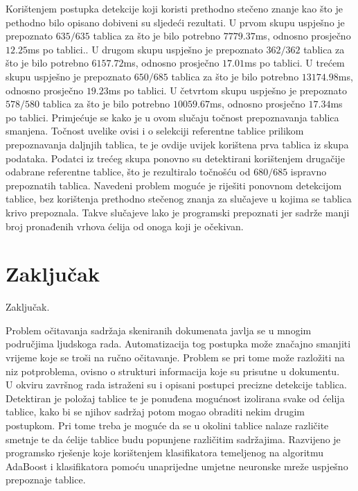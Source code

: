 \documentclass[times, utf8, zavrsni, numeric]{fer}
\begin{document}
Korištenjem postupka detekcije koji koristi prethodno stečeno znanje kao što je pethodno bilo opisano dobiveni su sljedeći rezultati.
U prvom skupu uspješno je prepoznato $635/635$ tablica za što je bilo potrebno $7779.37$ms, odnosno prosječno $12.25$ms po tablici..
U drugom skupu uspješno je prepoznato $362/362$ tablica za što je bilo potrebno $6157.72$ms, odnosno prosječno $17.01$ms po tablici.
U trećem skupu uspješno je prepoznato $650/685$ tablica za što je bilo potrebno $13174.98$ms, odnosno prosječno $19.23$ms po tablici.
U četvrtom skupu uspješno je prepoznato $578/580$ tablica za što je bilo potrebno $10059.67$ms, odnosno prosječno $17.34$ms po tablici.
Primjećuje se kako je u ovom slučaju točnost prepoznavanja tablica smanjena.
Točnost uvelike ovisi i o selekciji referentne tablice prilikom prepoznavanja daljnjih tablica, te je ovdije uvijek korištena prva tablica iz skupa podataka.
Podatci iz trećeg skupa ponovno su detektirani korištenjem drugačije odabrane referentne tablice, što je rezultiralo točnošću od $680/685$ ispravno prepoznatih tablica.
Navedeni problem moguće je riješiti ponovnom detekcijom tablice, bez korištenja prethodno stečenog znanja za slučajeve u kojima se tablica krivo prepoznala.
Takve slučajeve lako je programski prepoznati jer sadrže manji broj pronađenih vrhova ćelija od onoga koji je očekivan.\\


\chapter{Zaključak}
Zaključak.





\begin{sazetak}
Problem očitavanja sadržaja skeniranih dokumenata javlja se u mnogim područjima ljudskoga rada.
Automatizacija tog postupka može značajno smanjiti vrijeme koje se troši na ručno očitavanje. 
Problem se pri tome može razložiti na niz potproblema, ovisno o strukturi informacija koje su prisutne u dokumentu.\\

U okviru završnog rada istraženi su i opisani postupci precizne detekcije tablica. 
Detektiran je položaj tablice te je ponuđena mogućnost izolirana svake od ćelija tablice, kako bi se njihov sadržaj potom mogao obraditi nekim drugim postupkom.
Pri tome treba je moguće da se u okolini tablice nalaze različite smetnje te da ćelije tablice budu popunjene različitim sadržajima. 
Razvijeno je programsko rješenje koje korištenjem klasifikatora temeljenog na algoritmu AdaBoost i klasifikatora pomoću unaprijedne umjetne neuronske mreže uspješno prepoznaje tablice.


\end{sazetak}
\end{document}
